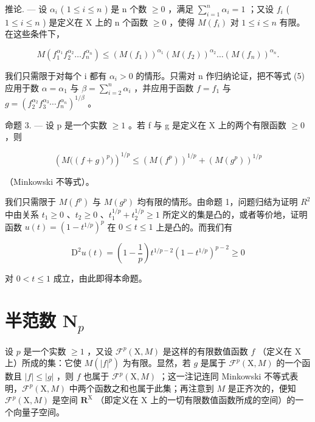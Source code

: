 推论. --- 设 \(\alpha_{i}\) ( \(1 \leqslant i \leqslant n\) ) 是 n 个数 \(\geqslant 0\) ，满足 \(\sum_{i=1}^{n} \alpha_{i} = 1\) ；又设 \(f_{i}\) ( \(1 \leqslant i \leqslant n\) ) 是定义在 X 上的 n 个函数 \(\geqslant 0\) ，使得 \(M(f_{i})\) 对 \(1 \leqslant i \leqslant n\) 有限。在这些条件下，

\[
M \left(f _ {1} ^ {\alpha_ {1}} f _ {2} ^ {\alpha_ {2}} \dots f _ {n} ^ {\alpha_ {n}}\right) \leqslant \left(M (f _ {1})\right) ^ {\alpha_ {1}} \left(M (f _ {2})\right) ^ {\alpha_ {2}} \dots \left(M (f _ {n})\right) ^ {\alpha_ {n}}.\tag{6}
\]

我们只需限于对每个 i 都有 \(\alpha_{i} > 0\) 的情形。只需对 n 作归纳论证，把不等式 (5) 应用于数 \(\alpha = \alpha_{1}\) 与 \(\beta = \sum_{i=2}^{n} \alpha_{i}\) ，并应用于函数 \(f = f_{1}\) 与 \(g = (f_{2}^{\alpha_{2}} f_{3}^{\alpha_{3}} \cdots f_{n}^{\alpha_{n}})^{1/\beta}\) 。

命题 3. --- 设 p 是一个实数 \(\geqslant 1\) 。若 f 与 g 是定义在 X 上的两个有限函数 \(\geqslant 0\) ，则

\[
\left(M \big ((f + g) ^ {p} \big)\right) ^ {1 / p} \leqslant \left(M (f ^ {p})\right) ^ {1 / p} + \left(M (g ^ {p})\right) ^ {1 / p}\tag{7}
\]

（Minkowski 不等式）。

我们只需限于 \(M(f^{p})\) 与 \(M(g^{p})\) 均有限的情形。由命题 1，问题归结为证明 \(R^{2}\) 中由关系 \(t_{1} \geqslant 0\) 、\(t_{2} \geqslant 0\) 、\(t_{1}^{1/p} + t_{2}^{1/p} \geqslant 1\) 所定义的集是凸的，或者等价地，证明函数 \(u(t) = (1 - t^{1/p})^{p}\) 在 \(0 \leqslant t \leqslant 1\) 上是凸的。而我们有

\[
\mathrm{D} ^ {2} u (t) = \left(1 - \frac {1}{p}\right) t ^ {1 / p - 2} (1 - t ^ {1 / p}) ^ {p - 2} \geqslant 0
\]

对 \(0 < t \leqslant 1\) 成立，由此即得本命题。

\section{\texorpdfstring{半范数 \(\mathbf{N}_p\)}{半范数 N sub p}}

设 \(p\) 是一个实数 \(\geqslant 1\) ，又设 \(\mathcal{F}^p(\mathrm{X},M)\) 是这样的有限数值函数 \(f\) （定义在 \(\mathrm{X}\) 上）所成的集：它使 \(M(|f|^p)\) 为有限。显然，若 \(g\) 是属于 \(\mathcal{F}^p(\mathrm{X},M)\) 的一个函数且 \(|f| \leqslant |g|\) ，则 \(f\) 也属于 \(\mathcal{F}^p(\mathrm{X},M)\) ；这一注记连同 Minkowski 不等式表明，\(\mathcal{F}^p(\mathrm{X},M)\) 中两个函数之和也属于此集；再注意到 \(M\) 是正齐次的，便知 \(\mathcal{F}^p(\mathrm{X},M)\) 是空间 \(\mathbf{R}^{\mathrm{X}}\) （即定义在 \(\mathrm{X}\) 上的一切有限数值函数所成的空间）的一个向量子空间。

